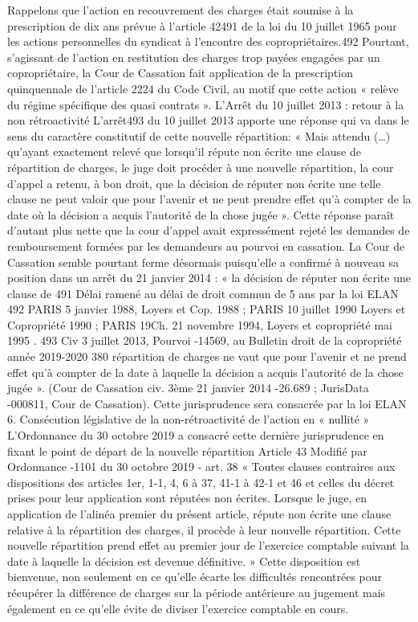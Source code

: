 Rappelons que l'action en recouvrement des charges était soumise à la prescription de dix ans prévue à l'article 42491 de la loi du 10 juillet 1965 pour les actions personnelles du syndicat à l'encontre des copropriétaires.492
Pourtant, s’agissant de l’action en restitution des charges trop payées engagées par un copropriétaire, la Cour de Cassation fait application de la prescription quinquennale de l’article 2224 du Code Civil, au motif que cette action « relève du régime spécifique des quasi contrats ».
\degres L’Arrêt du 10 juillet 2013 : retour à la non rétroactivité
L'arrêt493 du 10 juillet 2013 apporte une réponse qui va dans le sens du caractère constitutif de cette nouvelle répartition: « Mais attendu (…) qu'ayant exactement relevé que lorsqu'il répute non écrite une clause de répartition de charges, le juge doit procéder à une nouvelle répartition, la cour d'appel a retenu, à bon droit, que la décision de réputer non écrite une telle clause ne peut valoir que pour l'avenir et ne peut prendre effet qu'à compter de la date où la décision a acquis l'autorité de la chose jugée ».
Cette réponse paraît d'autant plus nette que la cour d'appel avait expressément rejeté les demandes de remboursement formées par les demandeurs au pourvoi en cassation.
La Cour de Cassation semble pourtant ferme désormais puisqu’elle a confirmé à nouveau sa position dans un arrêt du 21 janvier 2014 : « la décision de réputer non écrite une clause de
491 Délai ramené au délai de droit commun de 5 ans par la loi ELAN
492 PARIS 5 janvier 1988, Loyers et Cop. 1988 ; PARIS 10 juillet 1990 Loyers et Copropriété 1990 ; PARIS 19\degres Ch. 21 novembre 1994, Loyers et copropriété mai 1995 .
493 Civ 3 juillet 2013, Pourvoi -14569, au Bulletin
droit de la copropriété année 2019-2020
380
répartition de charges ne vaut que pour l’avenir et ne prend effet qu’à compter de la date à laquelle la décision a acquis l’autorité de la chose jugée ».
(Cour de Cassation civ. 3ème 21 janvier 2014 -26.689 ; JurisData -000811, Cour de Cassation).
Cette jurisprudence sera consacrée par la loi ELAN
6. Consécution législative de la non-rétroactivité de l’action en « nullité » L’Ordonnance du 30 octobre 2019 a consacré cette dernière jurisprudence en fixant le point de départ de la nouvelle répartition Article 43 Modifié par Ordonnance -1101 du 30 octobre 2019 - art. 38 « Toutes clauses contraires aux dispositions des articles 1er, 1-1, 4, 6 à 37, 41-1 à 42-1 et 46 et celles du décret prises pour leur application sont réputées non écrites. Lorsque le juge, en application de l'alinéa premier du présent article, répute non écrite une clause relative à la répartition des charges, il procède à leur nouvelle répartition. Cette nouvelle répartition prend effet au premier jour de l'exercice comptable suivant la date à laquelle la décision est devenue définitive. » Cette disposition est bienvenue, non seulement en ce qu’elle écarte les difficultés rencontrées pour récupérer la différence de charges sur la période antérieure au jugement mais également en ce qu’elle évite de diviser l’exercice comptable en cours.
